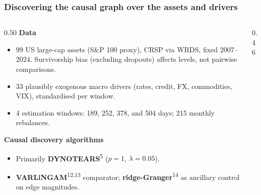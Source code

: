 \documentclass[
	aspectratio=169,
	t,
	onlytextwidth,
	10pt,
]{beamer}
\makeatletter
\newcommand{\key}[1]{\textcolor{ICLBlue}{\textbf{#1}}}
\newcommand{\dense}{\small\setlength{\parskip}{4pt}\def\@minipagerestore{\setlength{\parskip}{4pt}}}
\newcommand{\cn}[1]{\textsuperscript{\textcolor{ICLBlue}{#1}}}
\makeatother
\begin{document}

\begin{frame}
	\frametitle{Discovering the causal graph over the assets and drivers}
	\dense
	\begin{columns}[T]
		\begin{column}{0.50\linewidth}
			\textbf{Data}
			\begin{itemize}
				\setlength{\itemsep}{3pt}
				\item 99 US large-cap assets (S\&P 100 proxy), CRSP via WRDS, fixed 2007--2024. Survivorship bias (excluding dropouts) affects levels, not pairwise comparisons.
				\item 33 plausibly exogenous macro drivers (rates, credit, FX, commodities, VIX), standardised per window.
				\item 4 estimation windows: 189, 252, 378, and 504 days; 215 monthly rebalances.
			\end{itemize}
			\textbf{Causal discovery algorithms}
			\begin{itemize}
				\setlength{\itemsep}{3pt}
				\item Primarily \key{DYNOTEARS}\cn{5} ($p=1$, $\lambda=0.05$).
				\item \key{VARLiNGAM}\cn{12,13} comparator; \key{ridge-Granger}\cn{14} as ancillary control on edge magnitudes.
			\end{itemize}
		\end{column}
		\begin{column}{0.46\linewidth}
			\begin{center}
            \vspace{-1em}
\end{center}
\end{column}
\end{columns}
\end{frame}
\end{document}
